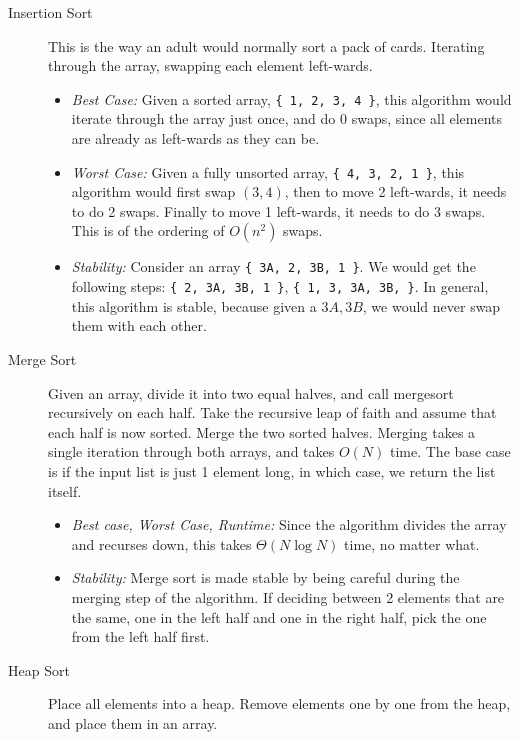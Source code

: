 \begin{solution}
\begin{description}
\item[Insertion Sort]
This is the way an adult would normally sort a pack of cards. Iterating through
the array, swapping each element left-wards.

\begin{itemize}
\item \textit{Best Case:} Given a sorted array, \lstinline${ 1, 2, 3, 4 }$,
this algorithm would iterate through the array just once, and do 0 swaps, since
all elements are already as left-wards as they can be.
\item \textit{Worst Case:} Given a fully unsorted array,
\lstinline${ 4, 3, 2, 1 }$, this algorithm would first swap $(3, 4)$, then to
move 2 left-wards, it needs to do 2 swaps. Finally to move 1 left-wards, it
needs to do 3 swaps. This is of the ordering of $O(n^2)$ swaps.
\item \textit{Stability:} Consider an array \lstinline${ 3A, 2, 3B, 1 }$. We
would get the following steps: \lstinline${ 2, 3A, 3B, 1 }$,
\lstinline${ 1, 3, 3A, 3B, }$. In general, this algorithm is stable, because
given a $3A, 3B$, we would never swap them with each other.
\end{itemize}

\item[Merge Sort]
Given an array, divide it into two equal halves, and call mergesort recursively
on each half. Take the recursive leap of faith and assume that each half is now
sorted. Merge the two sorted halves. Merging takes a single iteration through
both arrays, and takes $O(N)$ time. The base case is if the input list is just
1 element long, in which case, we return the list itself.

\begin{itemize}
\item \textit{Best case, Worst Case, Runtime:} Since the algorithm divides the
array and recurses down, this takes $\Theta(N \log N)$ time, no matter what.
\item \textit{Stability:} Merge sort is made stable by being careful during the
merging step of the algorithm. If deciding between 2 elements that are the
same, one in the left half and one in the right half, pick the one from the
left half first.
\end{itemize}

\item[Heap Sort]
Place all elements into a heap. Remove elements one by one from the heap, and
place them in an array.


\end{description}
\end{solution}
